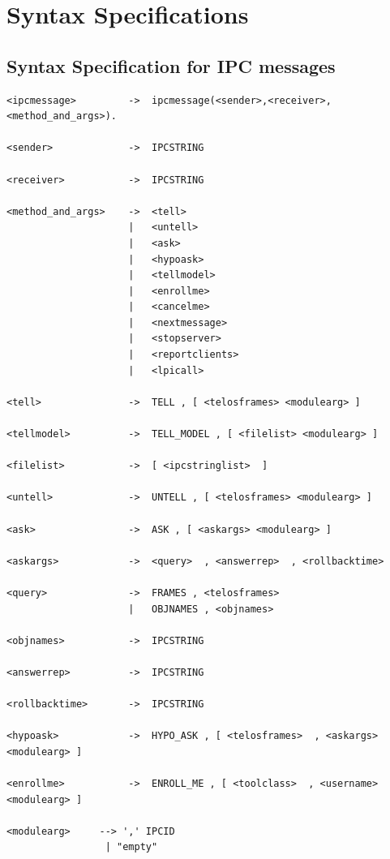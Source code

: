 \chapter{Syntax Specifications}
\label{cha:SyntaxSpec}


\section{Syntax Specification for IPC messages}
\label{sec:ipcmessages}

\begin{verbatim}
<ipcmessage>         ->  ipcmessage(<sender>,<receiver>,<method_and_args>).
 
<sender>             ->  IPCSTRING
 
<receiver>           ->  IPCSTRING
 
<method_and_args>    ->  <tell>
                     |   <untell>
                     |   <ask>
                     |   <hypoask>
                     |   <tellmodel>
                     |   <enrollme>
                     |   <cancelme>
                     |   <nextmessage>
                     |   <stopserver>
                     |   <reportclients>
                     |   <lpicall>
 
<tell>               ->  TELL , [ <telosframes> <modulearg> ]
 
<tellmodel>          ->  TELL_MODEL , [ <filelist> <modulearg> ]
 
<filelist>           ->  [ <ipcstringlist>  ]
 
<untell>             ->  UNTELL , [ <telosframes> <modulearg> ]
 
<ask>                ->  ASK , [ <askargs> <modulearg> ]
 
<askargs>            ->  <query>  , <answerrep>  , <rollbacktime>
 
<query>              ->  FRAMES , <telosframes>
                     |   OBJNAMES , <objnames>
 
<objnames>           ->  IPCSTRING
 
<answerrep>          ->  IPCSTRING
 
<rollbacktime>       ->  IPCSTRING
 
<hypoask>            ->  HYPO_ASK , [ <telosframes>  , <askargs> <modulearg> ]
 
<enrollme>           ->  ENROLL_ME , [ <toolclass>  , <username> <modulearg> ]
 
<modulearg>		-->	',' IPCID 
				 | "empty"


\end{verbatim}
